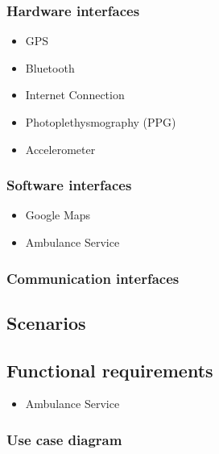 \documentclass{article}
\begin{document}
\subsubsection{Hardware interfaces}
\begin{itemize}
	\item GPS
	\item Bluetooth
	\item Internet Connection
	\item Photoplethysmography (PPG)
	\item Accelerometer
\end{itemize}
\subsubsection{Software interfaces}
\begin{itemize}
	\item Google Maps
	\item Ambulance Service
\end{itemize}
\subsubsection{Communication interfaces}
\subsection{Scenarios}
\subsection{Functional requirements}
\begin{itemize}
	\item Ambulance Service
\end{itemize}
\subsubsection{Use case diagram}
\end{document}
